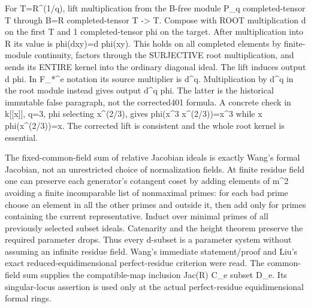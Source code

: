 \documentclass[11pt]{article}
\begin{document}
For T=R\textasciicircum{}(1/q), lift multiplication from the B-free module P\_q completed-tensor T through B=R completed-tensor T -> T. Compose with ROOT multiplication d on the first T and 1 completed-tensor phi on the target. After multiplication into R its value is phi(dxy)=d phi(xy). This holds on all completed elements by finite-module continuity, factors through the SURJECTIVE root multiplication, and sends its ENTIRE kernel into the ordinary diagonal ideal. The lift induces output d phi. In F\_*\textasciicircum{}e notation its source multiplier is d\textasciicircum{}q. Multiplication by d\textasciicircum{}q in the root module instead gives output d\textasciicircum{}q phi. The latter is the historical immutable false paragraph, not the corrected401 formula. A concrete check in k[[x]], q=3, phi selecting x\textasciicircum{}(2/3), gives phi(x\textasciicircum{}3 x\textasciicircum{}(2/3))=x\textasciicircum{}3 while x phi(x\textasciicircum{}(2/3))=x. The corrected lift is consistent and the whole root kernel is essential.

The fixed-common-field sum of relative Jacobian ideals is exactly Wang's formal Jacobian, not an unrestricted choice of normalization fields. At finite residue field one can preserve each generator's cotangent coset by adding elements of m\textasciicircum{}2 avoiding a finite incomparable list of nonmaximal primes: for each bad prime choose an element in all the other primes and outside it, then add only for primes containing the current representative. Induct over minimal primes of all previously selected subset ideals. Catenarity and the height theorem preserve the required parameter drops. Thus every d-subset is a parameter system without assuming an infinite residue field. Wang's immediate statement/proof and Liu's exact reduced-equidimensional perfect-residue criterion were read. The common-field sum supplies the compatible-map inclusion Jac(R) C\_e subset D\_e. Its singular-locus assertion is used only at the actual perfect-residue equidimensional formal rings.
\end{document}
